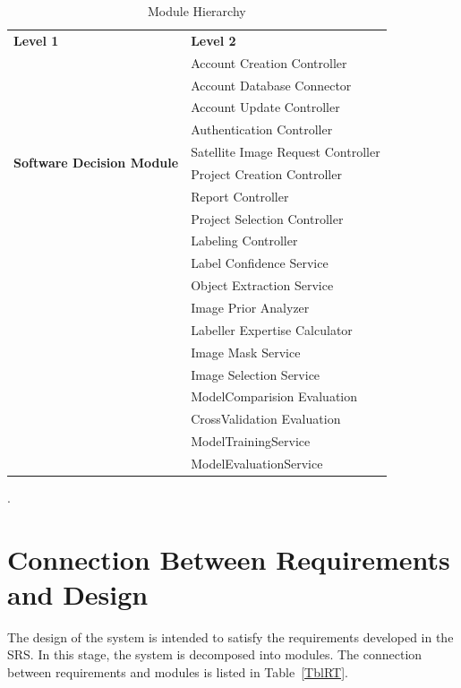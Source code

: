 \documentclass[12pt, titlepage]{article}
\begin{document}
\begin{table}[h!]
  \centering
  \begin{tabular}{p{} p{}} 
  \toprule
  \textbf{Level 1} & \textbf{Level 2}\\
  \multirow{10}{0.3\textwidth}{\textbf{Software Decision Module}} 
   & Account Creation Controller\\
   & Account Database Connector\\
   & Account Update Controller\\
   & Authentication Controller\\
   & Satellite Image Request Controller\\
   & Project Creation Controller\\
   & Report Controller\\
   & Project Selection Controller\\
   & Labeling Controller\\
   & Label Confidence Service\\
   & Object Extraction Service\\
   & Image Prior Analyzer\\
   & Labeller Expertise Calculator\\
   & Image Mask Service\\
   & Image Selection Service\\
   & ModelComparision Evaluation\\
   & CrossValidation Evaluation\\
   & ModelTrainingService\\
   & ModelEvaluationService\\
  \bottomrule
  \end{tabular}
  \caption{Module Hierarchy}
  \label{TblMH}
  \end{table}
  

\newpage 
.
\newpage 

\section{Connection Between Requirements and Design} \label{SecConnection}

The design of the system is intended to satisfy the requirements developed in
the SRS. In this stage, the system is decomposed into modules. The connection
between requirements and modules is listed in Table~\ref{TblRT}.
\end{document}

